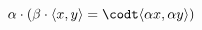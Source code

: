\documentclass[preview]{standalone}
\begin{document}
\begin{center}
$\alpha \cdot (\beta \cdot \langle x, y \rangle = \codt \langle \alpha x, \alpha y \rangle)$
\end{center}
\end{document}
